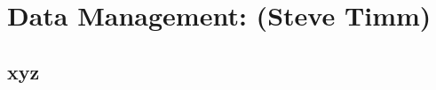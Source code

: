 \chapter{Data Management: (Steve Timm) }
\label{ch:datamgmt}

\section{xyz}
\label{sec:datamgmt:xyz}  %


